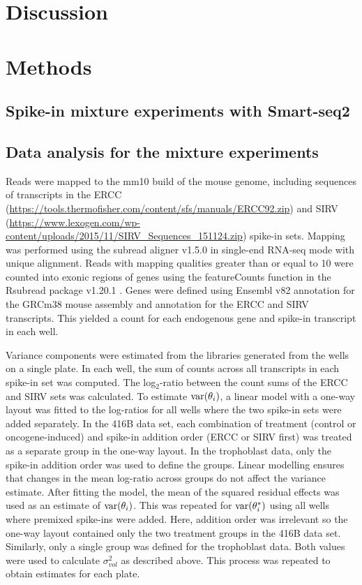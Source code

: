 \documentclass{article}
\begin{document}
\section{Discussion}

\section{Methods}

\subsection{Spike-in mixture experiments with Smart-seq2}

\subsection{Data analysis for the mixture experiments}
Reads were mapped to the mm10 build of the mouse genome, including sequences of transcripts in the ERCC (\url{https://tools.thermofisher.com/content/sfs/manuals/ERCC92.zip}) and SIRV (\url{https://www.lexogen.com/wp-content/uploads/2015/11/SIRV_Sequences_151124.zip}) spike-in sets.
Mapping was performed using the subread aligner v1.5.0 \cite{liao2013subread} in single-end RNA-seq mode with unique alignment.
Reads with mapping qualities greater than or equal to 10 were counted into exonic regions of genes using the featureCounts function in the Rsubread package v1.20.1 \cite{liao2014featurecounts}.
Genes were defined using Ensembl v82 annotation for the GRCm38 mouse assembly and annotation for the ERCC and SIRV transcripts.
This yielded a count for each endogenous gene and spike-in transcript in each well.

Variance components were estimated from the libraries generated from the wells on a single plate.
In each well, the sum of counts across all transcripts in each spike-in set was computed.
The log$_2$-ratio between the count sums of the ERCC and SIRV sets was calculated.
To estimate $\mbox{var}(\theta_i)$, a linear model with a one-way layout was fitted to the log-ratios for all wells where the two spike-in sets were added separately.
In the 416B data set, each combination of treatment (control or oncogene-induced) and spike-in addition order (ERCC or SIRV first) was treated as a separate group in the one-way layout.
In the trophoblast data, only the spike-in addition order was used to define the groups.
Linear modelling ensures that changes in the mean log-ratio across groups do not affect the variance estimate.
After fitting the model, the mean of the squared residual effects was used as an estimate of $\mbox{var}(\theta_i)$.
This was repeated for $\mbox{var}(\theta^*_i)$ using all wells where premixed spike-ins were added.
Here, addition order was irrelevant so the one-way layout contained only the two treatment groups in the 416B data set.
Similarly, only a single group was defined for the trophoblast data.
Both values were used to calculate $\sigma^2_{vol}$ as described above.
This process was repeated to obtain estimates for each plate.
\end{document}
